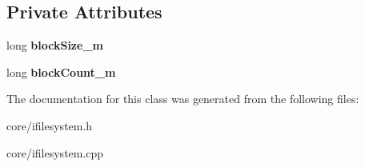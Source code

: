 \subsection*{Private Attributes}
\begin{DoxyCompactItemize}
\item 
\mbox{\label{class_i_file_system_a4af87f9255160f93c82e52a68aff0a70}} 
long {\bfseries block\+Size\+\_\+m}
\item 
\mbox{\label{class_i_file_system_a2963224aaf1c4850f992d90f48d7bdfa}} 
long {\bfseries block\+Count\+\_\+m}
\end{DoxyCompactItemize}


The documentation for this class was generated from the following files\+:\begin{DoxyCompactItemize}
\item 
core/ifilesystem.\+h\item 
core/ifilesystem.\+cpp\end{DoxyCompactItemize}
